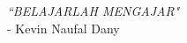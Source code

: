 \clearpage
{}%

\begin{Center}
	\centering \MakeUppercase {\textit{“Belajarlah Mengajar"}}\\
	- Kevin Naufal Dany
\end{Center}
 
\clearpage